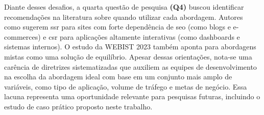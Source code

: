 Diante desses desafios, a  quarta questão de pesquisa \textbf{(Q4)} buscou identificar recomendações na literatura sobre quando utilizar cada abordagem. Autores como \cite{FadhilahIskandar2020} sugerem \acrshort{ssr} para sites com forte dependência de \acrshort{seo} (como blogs e e-commerces) e \acrshort{csr} para aplicações altamente interativas (como dashboards e sistemas internos). O estudo da WEBIST 2023 \cite{2023} também aponta para abordagens mistas como uma solução de equilíbrio. Apesar dessas orientações, nota-se uma carência de diretrizes sistematizadas que auxiliem as equipes de desenvolvimento na escolha da abordagem ideal com base em um conjunto mais amplo de variáveis, como tipo de aplicação, volume de tráfego e metas de negócio. Essa lacuna representa uma oportunidade relevante para pesquisas futuras, incluindo o estudo de caso prático proposto neste trabalho.

